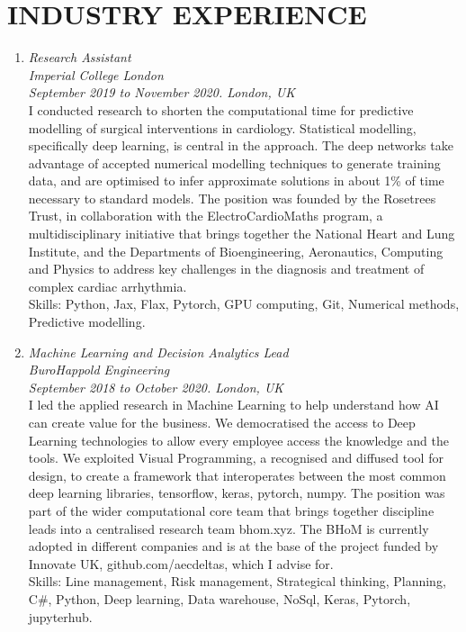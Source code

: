\section*{INDUSTRY EXPERIENCE}
    \begin{enumerate}[leftmargin=0.45cm, itemsep=1em, topsep=0.5em, parsep=0.2em]
        \item
        \emph{Research Assistant} \\
        \emph{Imperial College London}  \\
        \textit{September 2019 to November 2020. London, UK} \vspace{0.2em} \\
        {I conducted research to shorten the computational time for predictive modelling of surgical interventions in cardiology. Statistical modelling, specifically deep learning, is central in the approach. The deep networks take advantage of accepted numerical modelling techniques to generate training data, and are optimised to infer approximate solutions in about 1\% of time necessary to standard models. The position was founded by the Rosetrees Trust, in collaboration with the ElectroCardioMaths program, a multidisciplinary initiative that brings together the National Heart and Lung Institute, and the Departments of Bioengineering, Aeronautics, Computing and Physics to address key challenges in the diagnosis and treatment of complex cardiac arrhythmia.} \\
        Skills: Python, Jax, Flax, Pytorch, GPU computing, Git, Numerical methods, Predictive modelling.

        \item
        \emph{Machine Learning and Decision Analytics Lead} \\
        \emph{BuroHappold Engineering}  \\
        \textit{September 2018 to October 2020. London, UK} \vspace{0.2em} \\
        {I led the applied research in Machine Learning to help understand how AI can create value for the business. We democratised the access to Deep Learning technologies to allow every employee access the knowledge and the tools. We exploited Visual Programming, a recognised and diffused tool for design, to create a framework that interoperates between the most common deep learning libraries, tensorflow, keras, pytorch, numpy. The position was part of the wider computational core team that brings together discipline leads into a centralised research team bhom.xyz. The BHoM is currently adopted in different companies and is at the base of the project funded by Innovate UK, github.com/aecdeltas, which I advise for.} \\
        Skills: Line management, Risk management, Strategical thinking, Planning, C\#, Python, Deep learning, Data warehouse, NoSql, Keras, Pytorch, jupyterhub.


\end{enumerate}

